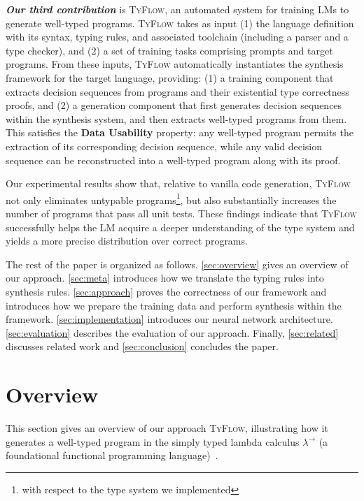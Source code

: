 \documentclass[manuscript,screen]{acmart}
\newcommand{\toolname}[1]{\textsc{#1}}
\newcommand{\mainname}{\toolname{TyFlow}\xspace}
\newcommand{\stlc}{\lambda^{\rightarrow}}
\begin{document}
\textbf{\textit{Our third contribution}} is \mainname, an automated system for training LMs to generate well-typed programs. \mainname takes as input (1) the language definition with its syntax, typing rules, and associated toolchain (including a parser and a type checker), and (2) a set of training tasks comprising prompts and target programs. 
From these inputs, \mainname automatically instantiates the synthesis framework for the target language, providing: (1) a training component that extracts decision sequences from programs and their existential type correctness proofs, and (2) a generation component that first generates decision sequences within the synthesis system, and then extracts well-typed programs from them.
This satisfies the \textbf{Data Usability} property: any well-typed program permits the extraction of its corresponding decision sequence, while any valid decision sequence can be reconstructed into a well-typed program along with its proof.

\smallskip
Our experimental results show that, relative to vanilla code generation, \mainname not only eliminates untypable programs\footnote{with respect to the type system we implemented}, but also substantially increases the number of programs that pass all unit tests. These findings indicate that \mainname successfully helps the LM acquire a deeper understanding of the type system and yields a more precise distribution over correct programs.

The rest of the paper is organized as follows. 
\autoref{sec:overview} gives an overview of our approach. 
\autoref{sec:meta} introduces how we translate the typing rules into synthesis rules. 
\autoref{sec:approach} proves the correctness of our framework and introduces how we prepare the training data and perform synthesis within the framework. 
\autoref{sec:implementation} introduces our neural network architecture. 
\autoref{sec:evaluation} describes the evaluation of our approach. 
Finally, \autoref{sec:related} discusses related work   and \autoref{sec:conclusion} concludes the paper.
 

 \section{Overview \label{sec:overview}}

This section gives an overview of our approach \mainname, illustrating how it generates a well-typed program in the simply typed lambda calculus $\stlc$ (a foundational functional programming language)~\cite{DBLP:journals/jsyml/Church40}.
\end{document}
